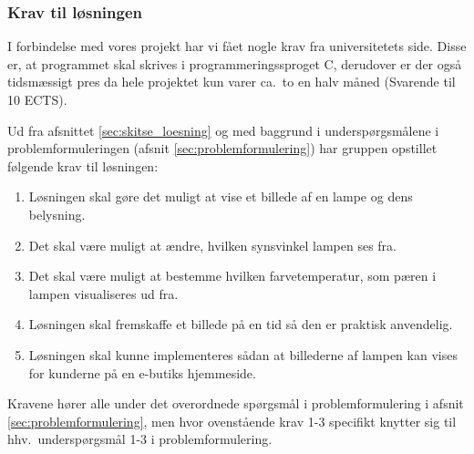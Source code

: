 \subsubsection{Krav til løsningen}
\label{sec:krav}

I forbindelse med vores projekt har vi fået nogle krav fra universitetets side. Disse er, at programmet skal skrives i programmeringssproget C, derudover er der også tidsmæssigt pres da hele projektet kun varer ca.\ to en halv måned (Svarende til 10 ECTS). 

Ud fra afsnittet \ref{sec:skitse_loesning} og med baggrund i underspørgsmålene i problemformuleringen (afsnit \ref{sec:problemformulering}) har gruppen opstillet følgende krav til løsningen:
\begin{enumerate}
    \item Løsningen skal gøre det muligt at vise et billede af en lampe og dens belysning.
    \item Det skal være muligt at ændre, hvilken synsvinkel lampen ses fra.
    \item Det skal være muligt at bestemme hvilken farvetemperatur, som pæren i lampen visualiseres ud fra.
    \item Løsningen skal fremskaffe et billede på en tid så den er praktisk anvendelig.
    \item Løsningen skal kunne implementeres sådan at billederne af lampen kan vises for kunderne på en e-butiks hjemmeside.
\end{enumerate}

Kravene hører alle under det overordnede spørgsmål i problemformulering i afsnit \ref{sec:problemformulering}, men hvor ovenstående krav 1-3 specifikt knytter sig til hhv.\ underspørgsmål 1-3 i problemformulering.